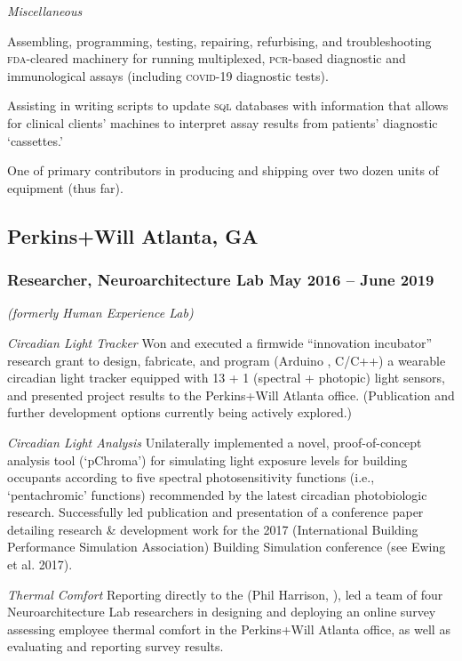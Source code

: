 \documentclass[letterpaper, oneside, 10pt]{article}
\begin{document}
\textit{Miscellaneous}\DotSep{0.25em}

Assembling, programming, testing, repairing, refurbising, and troubleshooting
\textsc{fda}-cleared machinery for running multiplexed, \textsc{pcr}-based
diagnostic and immunological assays (including \textsc{covid}-19 diagnostic
tests).

Assisting in writing scripts to update \textsc{sql} databases with information
that allows for clinical clients' machines to interpret assay results from
patients' diagnostic `cassettes.'

One of primary contributors in producing and shipping over two dozen units of
equipment (thus far).


\subsection*{Perkins+Will\DotSep{0.25em} Atlanta, GA}
\subsubsection*{Researcher, Neuroarchitecture Lab\DotSep{0.25em} May 2016 -- June 2019}

%
\DotSep{0.25em} \textit{(formerly Human Experience Lab)}%


\textit{Circadian Light Tracker}\DotSep{0.25em}
Won and executed a firmwide ``innovation incubator'' research grant to
design, fabricate, and program (Arduino , C/C++) a
wearable circadian light tracker equipped with 13 + 1 (spectral +
photopic) light sensors, and presented project results to the Perkins+Will
Atlanta office. (Publication and further development options currently
being actively explored.)

\textit{Circadian Light Analysis}\DotSep{0.25em}
Unilaterally implemented a novel, proof-of-concept analysis tool
(`pChroma') for simulating light exposure levels for building occupants
according to five spectral photosensitivity functions (i.e., `pentachromic'
functions) recommended by the latest circadian photobiologic research.
Successfully led publication and presentation of a conference paper
detailing research \& development work for the 2017 
(International Building Performance Simulation Association) Building
Simulation conference (see Ewing et al. 2017).

\textit{Thermal Comfort}\DotSep{0.25em}
Reporting directly to the  (Phil Harrison,
), led a team of four Neuroarchitecture Lab researchers
in designing and deploying an online survey assessing employee thermal
comfort in the Perkins+Will Atlanta office, as well as evaluating and
reporting survey results.
\end{document}
